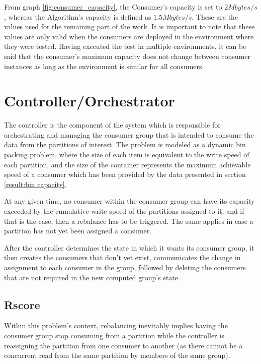 From graph \ref{fig:consumer_capacity}, the Consumer's capacity is set to $2
Mbytes/s$, whereas the Algorithm's capacity is defined as $1.5 Mbytes/s$.  These are
the values used for the remaining part of the work.  It is important to note
that these values are only valid when the consumers are deployed in the
environment where they were tested. Having executed the test in multiple
environments, it can be said that the consumer's maximum capacity does not
change between consumer instances as long as the environment is similar for all
consumers.

\section{Controller/Orchestrator} \label{component:controller}

The controller is the component of the system which is responsible for
orchestrating and managing the consumer group that is intended to consume the
data from the partitions of interest.  The problem is modeled as a dynamic bin
packing problem, where the size of each item is equivalent to the write speed of
each partition, and the size of the container represents the maximum achievable
speed of a consumer which has been provided by the data presented in section
\ref{result:bin capacity}.

At any given time, no consumer within the consumer group can have its capacity
exceeded by the cumulative write speed of the partitions assigned to it, and if
that is the case, then a rebalance has to be triggered. The same applies in case
a partition has not yet been assigned a consumer.

After the controller determines the state in which it wants its consumer group,
it then creates the consumers that don't yet exist, communicates the change in
assignment to each consumer in the group, followed by deleting the consumers
that are not required in the new computed group's state.

\subsection{Rscore}
\label{sub:rscore}

Within this problem's context, rebalancing inevitably implies having the
consumer group stop consuming from a partition while the controller is
reassigning the partition from one consumer to another (as there cannot be a
concurrent read from the same partition by members of the same group).

